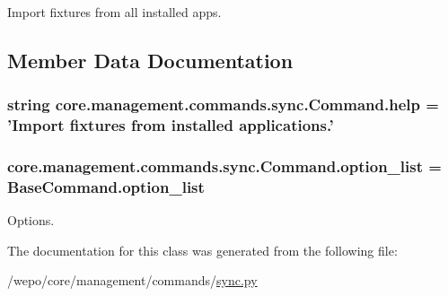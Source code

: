 Import fixtures from all installed apps. 



\subsection{Member Data Documentation}
\hypertarget{classcore_1_1management_1_1commands_1_1sync_1_1Command_a6efa96168e0103973ca2824e8a51e5ad}{
\subsubsection[{help}]{\setlength{\rightskip}{0pt plus 5cm}string core.\-management.\-commands.\-sync.\-Command.\-help = 'Import fixtures from installed applications.'\hspace{0.3cm}{\ttfamily [static]}}}\label{classcore_1_1management_1_1commands_1_1sync_1_1Command_a6efa96168e0103973ca2824e8a51e5ad}
\hypertarget{classcore_1_1management_1_1commands_1_1sync_1_1Command_aa3316701d237502a5f8c7d5ddf038613}{
\subsubsection[{option\-\_\-list}]{\setlength{\rightskip}{0pt plus 5cm}core.\-management.\-commands.\-sync.\-Command.\-option\-\_\-list = Base\-Command.\-option\-\_\-list\hspace{0.3cm}{\ttfamily [static]}}}\label{classcore_1_1management_1_1commands_1_1sync_1_1Command_aa3316701d237502a5f8c7d5ddf038613}


Options. 



The documentation for this class was generated from the following file\-:\begin{DoxyCompactItemize}
\item 
/wepo/core/management/commands/\hyperlink{sync_8py}{sync.\-py}\end{DoxyCompactItemize}
